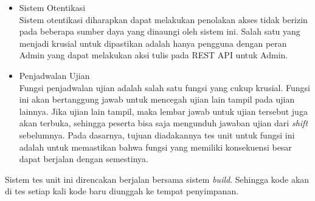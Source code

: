     \begin{itemize}
        \item Sistem Otentikasi \\
            Sistem otentikasi diharapkan dapat melakukan penolakan akses tidak berizin pada beberapa sumber daya
            yang dinaungi oleh sistem ini. Salah satu yang menjadi krusial untuk dipastikan adalah
            hanya pengguna dengan peran Admin yang dapat melakukan aksi tulis pada REST API untuk
            Admin.
        \item Penjadwalan Ujian \\
            Fungsi penjadwalan ujian adalah salah satu fungsi yang cukup krusial. Fungsi ini akan bertanggung
            jawab untuk mencegah ujian lain tampil pada ujian lainnya. Jika ujian lain tampil, maka lembar jawab
            untuk ujian tersebut juga akan terbuka, sehingga peserta bisa saja mengunduh jawaban ujian
            dari \textit{shift} sebelumnya. Pada dasarnya, tujuan diadakannya tes unit untuk fungsi ini
            adalah untuk memastikan bahwa fungsi yang memiliki konsekuensi besar dapat berjalan dengan
            semestinya.
    \end{itemize}
    
    Sistem tes unit ini direncakan berjalan bersama sistem \textit{build}. Sehingga kode akan di tes setiap kali
    kode baru diunggah ke tempat penyimpanan.
